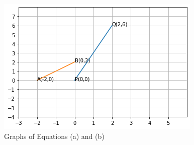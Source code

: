 \documentclass[journal,12pt,twocolumn]{IEEEtran}
\begin{document}
\begin{figure}[ht]
    \centering
    \includegraphics[width=\columnwidth]{GRAPHS.png}
    \caption{Graphs of Equations (a) and (b)}
    \label{Graphical solution}
\end{figure}
\end{document}
